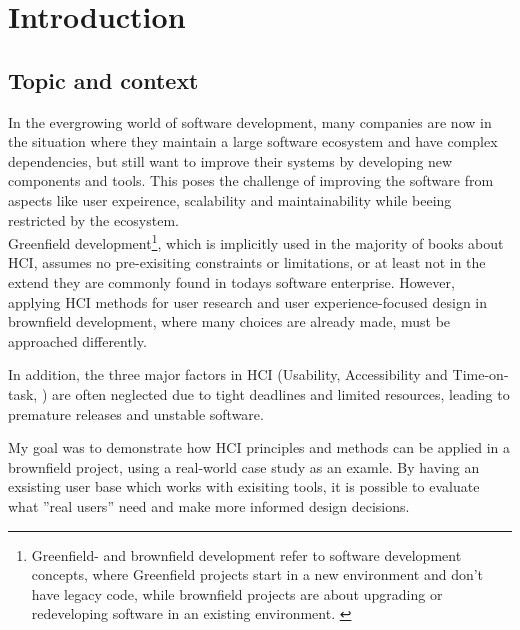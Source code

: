 %
\chapter{Introduction}
\label{chap:introduction}

\section{Topic and context}

In the evergrowing world of software development, many companies are now in the situation where they maintain a large software ecosystem and have complex dependencies,
but still want to improve their systems by developing new components and tools.
This poses the challenge of improving the software from aspects like user expeirence, scalability and maintainability while beeing restricted by the ecosystem.
\\
Greenfield development\footnote{Greenfield- and brownfield development refer to software development concepts, where Greenfield projects start in a new environment and don't have legacy code, while brownfield projects are about upgrading or redeveloping software in an existing environment. \cite{JohnAdamsIt:Greenfield}}, which is implicitly used in the majority of books about HCI, assumes no pre-exisiting constraints or limitations, or at least not in the extend they are commonly found in todays software enterprise.
However, applying HCI methods for user research and user experience-focused design in brownfield development, where many choices are already made, must be approached differently.

In addition, the three major factors in HCI (Usability, Accessibility and Time-on-task, \Cite[pp. 38-40]{LearnHCI:2020ys}) are often neglected due to tight deadlines and limited resources, leading to premature releases and unstable software.

My goal was to demonstrate how HCI principles and methods can be applied in a brownfield project, using a real-world case study as an examle.
By having an exsisting user base which works with exisiting tools, it is possible to evaluate what ''real users'' need and make more informed design decisions.

